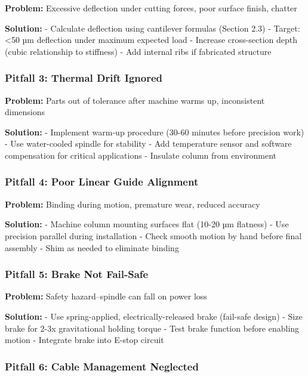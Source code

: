 \documentclass[
]{article}
\begin{document}
\textbf{Problem:} Excessive deflection under cutting forces, poor
surface finish, chatter

\textbf{Solution:} - Calculate deflection using cantilever formulas
(Section 2.3) - Target: \textless50 µm deflection under maximum expected
load - Increase cross-section depth (cubic relationship to stiffness) -
Add internal ribs if fabricated structure

\subsubsection{Pitfall 3: Thermal Drift
Ignored}\label{pitfall-3-thermal-drift-ignored}

\textbf{Problem:} Parts out of tolerance after machine warms up,
inconsistent dimensions

\textbf{Solution:} - Implement warm-up procedure (30-60 minutes before
precision work) - Use water-cooled spindle for stability - Add
temperature sensor and software compensation for critical applications -
Insulate column from environment

\subsubsection{Pitfall 4: Poor Linear Guide
Alignment}\label{pitfall-4-poor-linear-guide-alignment}

\textbf{Problem:} Binding during motion, premature wear, reduced
accuracy

\textbf{Solution:} - Machine column mounting surfaces flat (10-20 µm
flatness) - Use precision parallel during installation - Check smooth
motion by hand before final assembly - Shim as needed to eliminate
binding

\subsubsection{Pitfall 5: Brake Not
Fail-Safe}\label{pitfall-5-brake-not-fail-safe}

\textbf{Problem:} Safety hazard--spindle can fall on power loss

\textbf{Solution:} - Use spring-applied, electrically-released brake
(fail-safe design) - Size brake for 2-3x gravitational holding torque -
Test brake function before enabling motion - Integrate brake into E-stop
circuit

\subsubsection{Pitfall 6: Cable Management
Neglected}\label{pitfall-6-cable-management-neglected}
\end{document}
